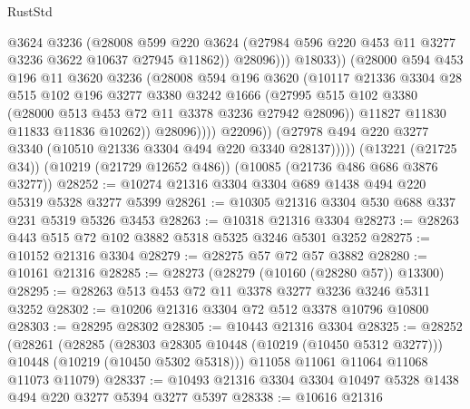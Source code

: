 \begin{lexlean}{RustStd}
\begin{coremodule}
                              @3624
                              @3236
                              (@28008
                                @599
                                @220
                                @3624
                                (@27984 @596 @220 @453 @11 @3277 @3236 @3622 @10637 @27945 @11862))
                              @28096)))
                        @18033))
                    (@28000
                      @594
                      @453
                      @196
                      @11
                      @3620
                      @3236
                      (@28008
                        @594
                        @196
                        @3620
                        (@10117
                          @21336
                          @3304
                          @28
                          @515
                          @102
                          @196
                          @3277
                          @3380
                          @3242
                          @1666
                          (@27995
                            @515
                            @102
                            @3380
                            (@28000 @513 @453 @72 @11 @3378 @3236 @27942 @28096))
                          @11827
                          @11830
                          @11833
                          @11836
                          @10262))
                      @28096))))
              @22096))
          (@27978 @494 @220 @3277 @3340 (@10510 @21336 @3304 @494 @220 @3340 @28137)))))
    (@13221 (@21725 @34))
    (@10219 (@21729 @12652 @486))
    (@10085 (@21736 @486 @686 @3876 @3277))
@28252 := @10274 @21316 @3304 @3304 @689 @1438 @494 @220 @5319 @5328 @3277 @5399
@28261 := @10305 @21316 @3304 @530 @688 @337 @231 @5319 @5326 @3453
@28263 := @10318 @21316 @3304
@28273 := @28263 @443 @515 @72 @102 @3882 @5318 @5325 @3246 @5301 @3252
@28275 := @10152 @21316 @3304
@28279 := @28275 @57 @72 @57 @3882
@28280 := @10161 @21316
@28285 := @28273 (@28279 (@10160 (@28280 @57)) @13300)
@28295 := @28263 @513 @453 @72 @11 @3378 @3277 @3236 @3246 @5311 @3252
@28302 := @10206 @21316 @3304 @72 @512 @3378 @10796 @10800
@28303 := @28295 @28302
@28305 := @10443 @21316 @3304
@28325 := @28252
    (@28261
      (@28285
        (@28303 @28305 @10448 (@10219 (@10450 @5312 @3277)))
        @10448
        (@10219 (@10450 @5302 @5318)))
      @11058
      @11061
      @11064
      @11068
      @11073
      @11079)
@28337 := @10493 @21316 @3304 @3304 @10497 @5328 @1438 @494 @220 @3277 @5394 @3277 @5397
@28338 := @10616 @21316

\end{coremodule}
\end{lexlean}
